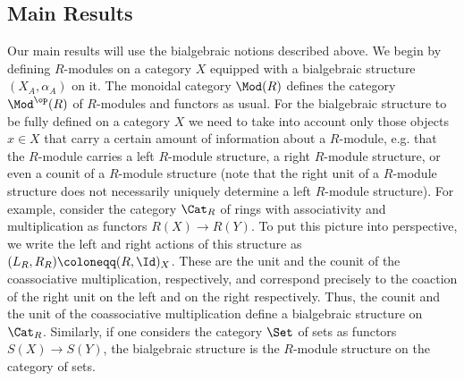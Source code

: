 \documentclass[a4paper,reqno,oneside]{article}
\begin{document}
\subsection*{Main Results}
Our main results will use the bialgebraic notions described above. We begin by defining $R$-modules on a category $X$ equipped with a bialgebraic structure $(X_A,\alpha_A)$ on it. The monoidal category $\Mod(R)$ defines the category $\Mod^{\op}(R)$ of $R$-modules and functors as usual. For the bialgebraic structure to be fully defined on a category $X$ we need to take into account only those objects $x \in X$ that carry a certain amount of information about a $R$-module, e.g. that the $R$-module carries a left $R$-module structure, a right $R$-module structure, or even a counit of a $R$-module structure (note that the right unit of a $R$-module structure does not necessarily uniquely determine a left $R$-module structure). For example, consider the category $\Cat_{R}$ of rings with associativity and multiplication as functors $R(X) \to R(Y)$. To put this picture into perspective, we write the left and right actions of this structure as $(L_R,R_R) \coloneqq (R,\Id)_{X}$. These are the unit and the counit of the coassociative multiplication, respectively, and correspond precisely to the coaction of the right unit on the left and on the right respectively. Thus, the counit and the unit of the coassociative multiplication define a bialgebraic structure on $\Cat_{R}$. Similarly, if one considers the category $\Set$ of sets as functors $S(X) \to S(Y)$, the bialgebraic structure is the $R$-module structure on the category of sets. 
 
\end{document}
